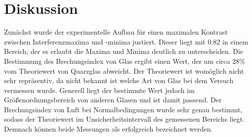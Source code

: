 \section{Diskussion}
    Zunächst wurde der experimentelle Aufbau für einen maximalen Kontrast zwischen Interferenzmaxima und -minima justiert. Dieser liegt mit \num{0.82} in einem Bereich, der es erlaubt die Maxima und Minima 
    deutlich zu unterscheiden.\newline
    Die Bestimmung des Brechungsindex von Glas ergibt einen Wert, der um circa 28\% vom Theoriewert von Quarzglas abweicht. Der Theoriewert ist womöglich nicht sehr repräsentiv, da nicht bekannt ist welche 
    Art von Glas bei dem Versuch vermessen wurde. Generell liegt der bestimmte Wert jedoch im Größenordnungsbereich von anderen Glasen und ist damit passend.\newline
    Der Brechungsindex von Luft bei Normalbedingungen wurde sehr genau bestimmt, sodass der Theoriewert im Unsicherheitsintervall des gemessenen Bereichs liegt.\newline
    Demnach können beide Messungen als erfolgreich bezeichnet werden.       
    
